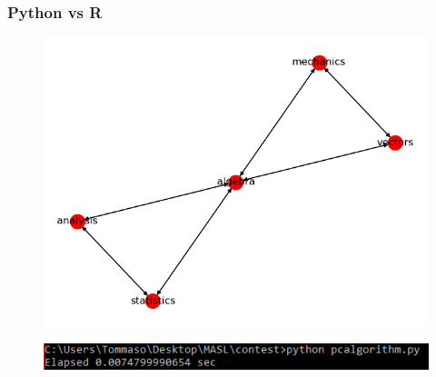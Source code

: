 \documentclass[xcolor ={table,usenames,dvipsnames}]{beamer}
\theoremstyle{definition}
\begin{document}
\begin{frame}
\frametitle{Python vs R}
\begin{figure}[h!]
	\centering
	\includegraphics[scale=0.4]{img/pydag}
\end{figure}
\begin{figure}[h!]
	\centering
	\includegraphics[scale=0.8]{img/pytime}
\end{figure}
\end{frame}
\end{document}
